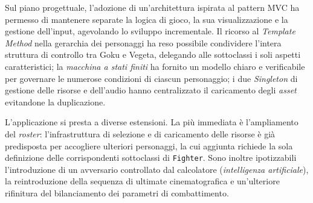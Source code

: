 \documentclass[12pt,a4paper]{report}
\begin{document}
Sul piano progettuale, l'adozione di un'architettura ispirata al pattern MVC ha permesso di mantenere separate la logica di gioco, la sua visualizzazione e la gestione dell'input, agevolando lo sviluppo incrementale. Il ricorso al \emph{Template Method} nella gerarchia dei personaggi ha reso possibile condividere l'intera struttura di controllo tra Goku e Vegeta, delegando alle sottoclassi i soli aspetti caratteristici; la \emph{macchina a stati finiti} ha fornito un modello chiaro e verificabile per governare le numerose condizioni di ciascun personaggio; i due \emph{Singleton} di gestione delle risorse e dell'audio hanno centralizzato il caricamento degli \emph{asset} evitandone la duplicazione.

L'applicazione si presta a diverse estensioni. La più immediata è l'ampliamento del \emph{roster}: l'infrastruttura di selezione e di caricamento delle risorse è già predisposta per accogliere ulteriori personaggi, la cui aggiunta richiede la sola definizione delle corrispondenti sottoclassi di \texttt{Fighter}. Sono inoltre ipotizzabili l'introduzione di un avversario controllato dal calcolatore (\emph{intelligenza artificiale}), la reintroduzione della sequenza di ultimate cinematografica e un'ulteriore rifinitura del bilanciamento dei parametri di combattimento.


%
%




\nocite{sprites,audiofreesound,audiomyinstants,audiovoicy,fontsaiyan,fontbangers}

\end{document}

